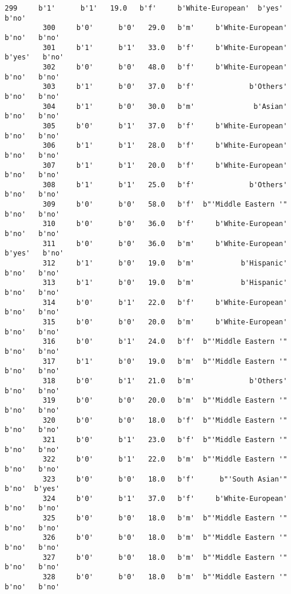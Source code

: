 \documentclass[11pt]{article}
\begin{document}
\begin{Verbatim}[commandchars=\\\{\}]
         299     b'1'      b'1'   19.0   b'f'     b'White-European'  b'yes'   b'no'   
         300     b'0'      b'0'   29.0   b'm'     b'White-European'   b'no'   b'no'   
         301     b'1'      b'1'   33.0   b'f'     b'White-European'  b'yes'   b'no'   
         302     b'0'      b'0'   48.0   b'f'     b'White-European'   b'no'   b'no'   
         303     b'1'      b'0'   37.0   b'f'             b'Others'   b'no'   b'no'   
         304     b'1'      b'0'   30.0   b'm'              b'Asian'   b'no'   b'no'   
         305     b'0'      b'1'   37.0   b'f'     b'White-European'   b'no'   b'no'   
         306     b'1'      b'1'   28.0   b'f'     b'White-European'   b'no'   b'no'   
         307     b'1'      b'1'   20.0   b'f'     b'White-European'   b'no'   b'no'   
         308     b'1'      b'1'   25.0   b'f'             b'Others'   b'no'   b'no'   
         309     b'0'      b'0'   58.0   b'f'  b"'Middle Eastern '"   b'no'   b'no'   
         310     b'0'      b'0'   36.0   b'f'     b'White-European'   b'no'   b'no'   
         311     b'0'      b'0'   36.0   b'm'     b'White-European'  b'yes'   b'no'   
         312     b'1'      b'0'   19.0   b'm'           b'Hispanic'   b'no'   b'no'   
         313     b'1'      b'0'   19.0   b'm'           b'Hispanic'   b'no'   b'no'   
         314     b'0'      b'1'   22.0   b'f'     b'White-European'   b'no'   b'no'   
         315     b'0'      b'0'   20.0   b'm'     b'White-European'   b'no'   b'no'   
         316     b'0'      b'1'   24.0   b'f'  b"'Middle Eastern '"   b'no'   b'no'   
         317     b'1'      b'0'   19.0   b'm'  b"'Middle Eastern '"   b'no'   b'no'   
         318     b'0'      b'1'   21.0   b'm'             b'Others'   b'no'   b'no'   
         319     b'0'      b'0'   20.0   b'm'  b"'Middle Eastern '"   b'no'   b'no'   
         320     b'0'      b'0'   18.0   b'f'  b"'Middle Eastern '"   b'no'   b'no'   
         321     b'0'      b'1'   23.0   b'f'  b"'Middle Eastern '"   b'no'   b'no'   
         322     b'0'      b'1'   22.0   b'm'  b"'Middle Eastern '"   b'no'   b'no'   
         323     b'0'      b'0'   18.0   b'f'      b"'South Asian'"   b'no'  b'yes'   
         324     b'0'      b'1'   37.0   b'f'     b'White-European'   b'no'   b'no'   
         325     b'0'      b'0'   18.0   b'm'  b"'Middle Eastern '"   b'no'   b'no'   
         326     b'0'      b'0'   18.0   b'm'  b"'Middle Eastern '"   b'no'   b'no'   
         327     b'0'      b'0'   18.0   b'm'  b"'Middle Eastern '"   b'no'   b'no'   
         328     b'0'      b'0'   18.0   b'm'  b"'Middle Eastern '"   b'no'   b'no'   

\end{Verbatim}
\end{document}
